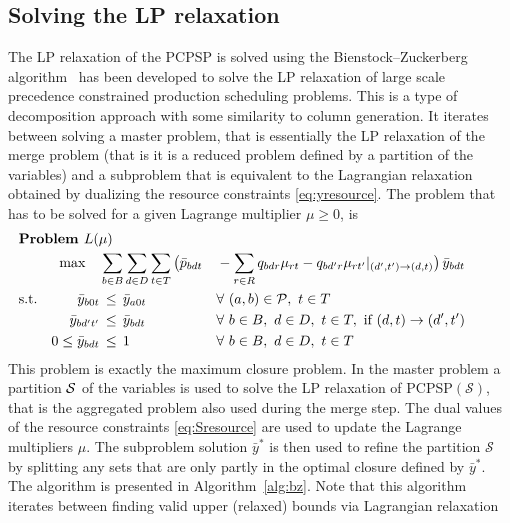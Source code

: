 \documentclass[authoryear,11pt,square,number,times,super,comma]{elsarticle}
\def\by{\bar{y}}
\begin{document}
\subsection{Solving the LP relaxation}\label{sec:bienstock}

The LP relaxation of the PCPSP is solved using the Bienstock--Zuckerberg algorithm~\citep{zuckerberg2010} has been developed to solve the LP relaxation of 
large scale precedence constrained production scheduling problems. This is a type of decomposition approach with some similarity to column generation. It iterates between solving a master problem, that is essentially the LP relaxation of the merge problem (that is it is a reduced problem defined by a partition of the variables) and a subproblem that is equivalent to the Lagrangian relaxation obtained by dualizing the resource constraints \eqref{eq:yresource}. The problem that has to be solved for a given Lagrange multiplier $\mu\ge 0$, is
\begin{alignat}{3}
  \noalign{\noindent\bf Problem $L(\mu)$}
  &&\max\quad&\sum_{b\in B}\sum_{d\in D}\sum_{t\in T} \big(\bar p_{bdt}&&-\sum_{r\in R}q_{bdr}\mu_{rt}-q_{bd'r}\mu_{rt'}|_{(d',t')\rightarrow(d,t)}\big)\,\bar y_{bdt}    \label{eq:Lobj}\\
  \text{s.t.} && \by_{b0t} &\,\leq\, \by_{a0t}&&\forall\ (a,b)\in\mathcal{P},\ t\in T  \label{eq:Lprec}\\ 
  && \by_{bd't'} &\,\leq\, \by_{bdt} && \forall\ b\in B,\ d\in D,\ t\in T,
  \text{ if }(d,t)\rightarrow(d',t') \label{eq:Lincr}\\
   &&0\leq \by_{bdt}&\,\leq\, 1
  &&\forall\ b\in B,\ d\in D,\ t\in T \label{eq:Lvars}
\end{alignat}
This problem is exactly the maximum closure problem.
In the master problem a partition $\cal S$ of the variables is used to solve the LP relaxation of PCPSP$(\mathcal{S})$, that is the aggregated problem also used during the merge step. The dual values of the resource constraints \eqref{eq:Sresource} are used to update the Lagrange multipliers $\mu$. The subproblem solution $\bar y^*$ is then used to refine the partition $\mathcal{S}$  by splitting any sets that are only partly in the optimal closure defined by $\bar y^*$. The 
algorithm is presented in Algorithm~\ref{alg:bz}. Note that this algorithm iterates between finding valid upper (relaxed) bounds via Lagrangian relaxation 
\end{document}
